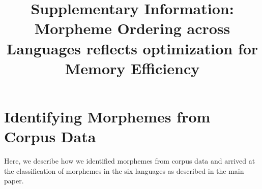 \documentclass[11pt,letterpaper]{article}
\title{Supplementary Information: Morpheme Ordering across Languages reflects optimization for Memory Efficiency}
\begin{document}
\maketitle

\tableofcontents





\section{Identifying Morphemes from Corpus Data}

Here, we describe how we identified morphemes from corpus data and arrived at the classification of morphemes in the six languages as described in the main paper.



    
\end{document}

